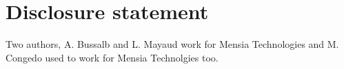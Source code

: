 
\section{Disclosure statement}

Two authors, A. Bussalb and L. Mayaud work for Mensia Technologies and M. Congedo used to work for Mensia Technolgies too. 